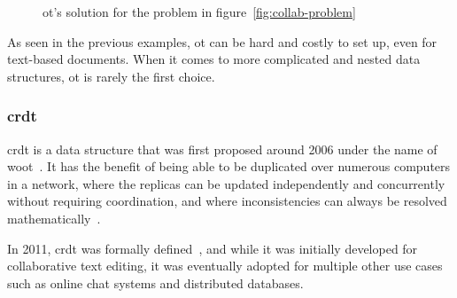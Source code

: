 \begin{figure}[H]
  \centerfloat
  \sffamily

  \caption{\acrshort{ot}'s solution for the problem in figure~\ref{fig:collab-problem}}
  \label{fig:collab-sol-ot}
\end{figure}

As seen in the previous examples, \acrshort{ot} can be hard and costly to set up, even for text-based documents.
When it comes to more complicated and nested data structures, \acrshort{ot} is rarely the first choice.

\subsubsection{\acrshort{crdt}}

\acrlong{crdt} is a data structure that was first proposed around 2006 under the name of \acrfull{woot}~\autocite{sun_real_2020}.
It has the benefit of being able to be duplicated over numerous computers in a network, where the replicas can be updated independently and concurrently without requiring coordination, and where inconsistencies can always be resolved mathematically~\autocite{shapiro_conflict-free_2011}.

In 2011, \acrshort{crdt} was formally defined~\autocite{shapiro_conflict-free_2011}, and while it was initially developed for collaborative text editing, it was eventually adopted for multiple other use cases such as online chat systems and distributed databases.

